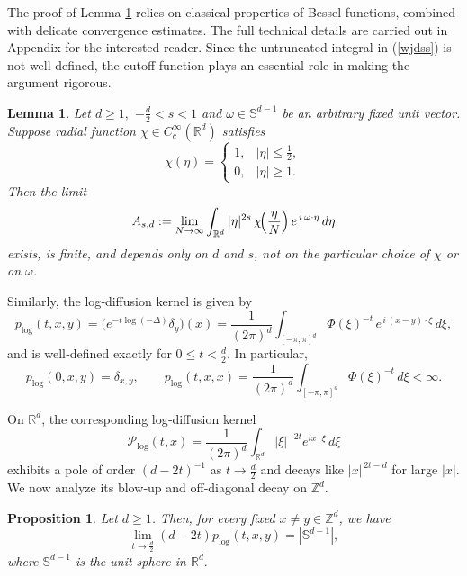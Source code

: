 \documentclass[reqno,12pt]{amsart}
\numberwithin{equation}{section}
\newtheorem{proposition}[theorem]{Proposition}
\newtheorem{lemma}[theorem]{Lemma}
\begin{document}
	  The proof of Lemma \ref{jieduan11} relies on classical properties of Bessel functions, combined with delicate convergence estimates. The full technical details are carried out in Appendix  for the interested reader. Since the untruncated integral in (\ref{wjdss}) is not well-defined, the cutoff function plays an essential role in making the argument rigorous. 



\begin{lemma}\label{jieduan11}
	Let \(d\ge1,\) \(-\frac{d}{2}<s<1\) and  \(\omega\in \mathbb{S}^{d-1}\) be an arbitrary fixed unit vector.  Suppose radial function 
	\(\chi\in C_c^\infty(\mathbb{R}^d)\) satisfies
	\[
	\chi(\eta)=
	\begin{cases}
		1, & |\eta|\le \frac{1}{2},\\
		0, & |\eta|\ge 1.
	\end{cases}
	\]
	Then the limit
	\begin{equation}\label{wjdss}
	A_{s,d}
		:=\lim_{N\to\infty}
		\int_{\mathbb{R}^d}|\eta|^{2s}\,\chi\!\Bigl(\frac{\eta}{N}\Bigr)\,e^{\,i\,\omega\cdot\eta}\,d\eta
	\end{equation}
	exists, is finite, and depends only on \(d\) and \(s\), not on the particular choice of \(\chi\) or on \(\omega\).
\end{lemma}


Similarly, the log‐diffusion kernel is given by
\[
p_{\log}(t,x,y)
=\bigl(e^{-t\log(-\Delta)}\delta_y\bigr)(x)
=\frac1{(2\pi)^d}
\int_{[-\pi,\pi]^d}\Phi(\xi)^{-t}\,e^{\,i\,(x-y)\cdot\xi}\,d\xi,
\]
and is well‐defined exactly for $0\le t<\frac d2.$ In particular,
\[
p_{\log}(0,x,y)=\delta_{x,y},
\qquad
p_{\log}(t,x,x)
=\frac1{(2\pi)^d}\int_{[-\pi,\pi]^d}\Phi(\xi)^{-t}\,d\xi
<\infty.
\]

On $\mathbb{R}^d$, the corresponding log‐diffusion kernel \cite{chen2024cauchy}
$$\displaystyle \mathcal P_{\log}(t,x) =\frac1{(2\pi)^d}\int_{\mathbb{R}^d}|\xi|^{-2t}e^{i x\cdot\xi}\,d\xi$$
exhibits a pole of order $(d-2t)^{-1}$ as $t\to\frac d2$ and decays like $\lvert x\rvert^{\,2t-d}$ for large $\lvert x\rvert$. We now analyze its blow‐up and off‐diagonal decay on $\mathbb{Z}^d.$

\begin{proposition}\label{prop:log_blowup_and_delta11}
	Let \(d\ge 1\). Then, for every fixed \(x\ne y\in \mathbb{Z}^d\), we have
	\[
	\lim\limits_{t\rightarrow \frac{d}{2}}\left(d-2t\right)p_{\log}(t,x,y)=|\mathbb{S}^{d-1}|,
	\]
	where $\mathbb{S}^{d-1}$ is the unit sphere in $\mathbb{R}^d.$
\end{proposition}
\end{document}
